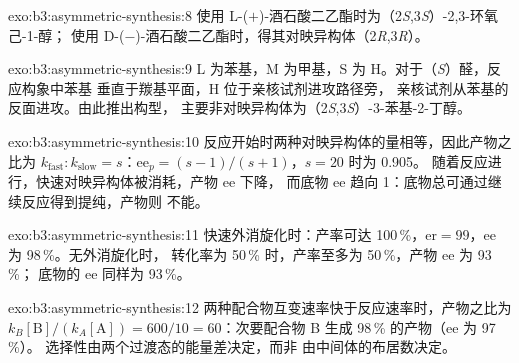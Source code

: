 \begin{solution}{exo:b3:asymmetric-synthesis:8}
使用 L-($+$)-酒石酸二乙酯时为（2\textit{S},3\textit{S}）-2,3-环氧己-1-醇；
使用 D-($-$)-酒石酸二乙酯时，得其对映异构体（2\textit{R},3\textit{R}）。
\end{solution}

\begin{solution}{exo:b3:asymmetric-synthesis:9}
L 为苯基，M 为甲基，S 为 H。对于（\textit{S}）醛，反应构象中苯基
垂直于羰基平面，H 位于亲核试剂进攻路径旁，
亲核试剂从苯基的反面进攻。由此推出构型，
主要非对映异构体为（2\textit{S},3\textit{S}）-3-苯基-2-丁醇。
\end{solution}

\begin{solution}{exo:b3:asymmetric-synthesis:10}
反应开始时两种对映异构体的量相等，因此产物之比为
$k_{\mathrm{fast}} : k_{\mathrm{slow}} = s$：$\mathrm{ee}_p = (s - 1)/(s + 1)$，$s = 20$ 时为 0.905。
随着反应进行，快速对映异构体被消耗，产物 ee 下降，
而底物 ee 趋向 1：底物总可通过继续反应得到提纯，产物则
不能。
\end{solution}

\begin{solution}{exo:b3:asymmetric-synthesis:11}
快速外消旋化时：产率可达 100\,\%，$\mathrm{er} = 99$，ee 为 98\,\%。无外消旋化时，
转化率为 50\,\% 时，产率至多为 50\,\%，产物 ee 为 93\,\%；
底物的 ee 同样为 93\,\%。
\end{solution}

\begin{solution}{exo:b3:asymmetric-synthesis:12}
两种配合物互变速率快于反应速率时，产物之比为
$k_B[\mathrm B]/(k_A[\mathrm A]) = 600/10 = 60$：次要配合物 B 生成 98\,\% 的产物（ee 为 97\,\%）。
选择性由两个过渡态的能量差决定，而非
由中间体的布居数决定。
\end{solution}

